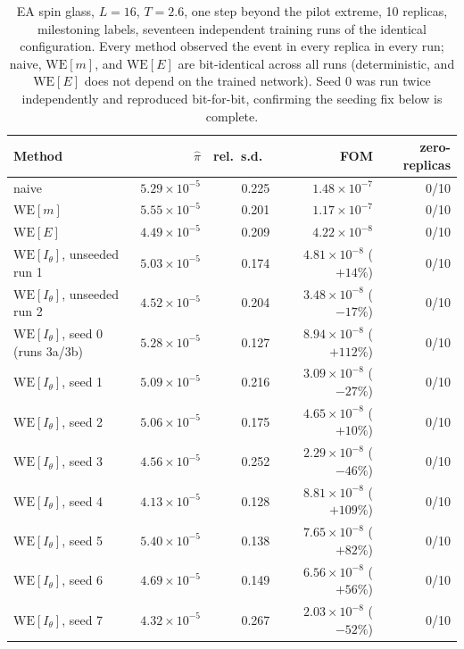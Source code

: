 \documentclass[a4paper,fleqn]{cas-sc}
\begin{document}
\begin{table}[H]
\centering\small
\caption{EA spin glass, $L=16$, $T=2.6$, one step beyond the pilot extreme, 10 replicas,
	milestoning labels, seventeen independent training runs of the identical configuration.
	Every method observed the event in every replica in every run; naive,
	$\mathrm{WE}[m]$, and $\mathrm{WE}[E]$ are bit-identical across all runs (deterministic,
	and $\mathrm{WE}[E]$ does not depend on the trained network). Seed 0 was run twice
	independently and reproduced bit-for-bit, confirming the seeding fix below is
	complete.}
\label{tab:milestone}
\begin{tabular}{lrrrr}
	\toprule
	Method & $\hat\pi$ & rel.\ s.d.\ & FOM & zero-replicas \\
	\midrule
	naive & $5.29\times10^{-5}$ & 0.225 & $1.48\times10^{-7}$ & 0/10 \\
	$\mathrm{WE}[m]$ & $5.55\times10^{-5}$ & 0.201 & $1.17\times10^{-7}$ & 0/10 \\
	$\mathrm{WE}[E]$ & $4.49\times10^{-5}$ & 0.209 & $4.22\times10^{-8}$ & 0/10 \\
	$\mathrm{WE}[I_\theta]$, unseeded run 1 & $5.03\times10^{-5}$ & 0.174 &
	$4.81\times10^{-8}$ ($+14\%$) & 0/10 \\
	$\mathrm{WE}[I_\theta]$, unseeded run 2 & $4.52\times10^{-5}$ & 0.204 &
	$3.48\times10^{-8}$ ($-17\%$) & 0/10 \\
	$\mathrm{WE}[I_\theta]$, seed 0 (runs 3a/3b) & $5.28\times10^{-5}$ & 0.127 &
	$8.94\times10^{-8}$ ($+112\%$) & 0/10 \\
	$\mathrm{WE}[I_\theta]$, seed 1 & $5.09\times10^{-5}$ & 0.216 &
	$3.09\times10^{-8}$ ($-27\%$) & 0/10 \\
	$\mathrm{WE}[I_\theta]$, seed 2 & $5.06\times10^{-5}$ & 0.175 &
	$4.65\times10^{-8}$ ($+10\%$) & 0/10 \\
	$\mathrm{WE}[I_\theta]$, seed 3 & $4.56\times10^{-5}$ & 0.252 &
	$2.29\times10^{-8}$ ($-46\%$) & 0/10 \\
	$\mathrm{WE}[I_\theta]$, seed 4 & $4.13\times10^{-5}$ & 0.128 &
	$8.81\times10^{-8}$ ($+109\%$) & 0/10 \\
	$\mathrm{WE}[I_\theta]$, seed 5 & $5.40\times10^{-5}$ & 0.138 &
	$7.65\times10^{-8}$ ($+82\%$) & 0/10 \\
	$\mathrm{WE}[I_\theta]$, seed 6 & $4.69\times10^{-5}$ & 0.149 &
	$6.56\times10^{-8}$ ($+56\%$) & 0/10 \\
	$\mathrm{WE}[I_\theta]$, seed 7 & $4.32\times10^{-5}$ & 0.267 &
	$2.03\times10^{-8}$ ($-52\%$) & 0/10 \\

\end{tabular}
\end{table}
\end{document}

